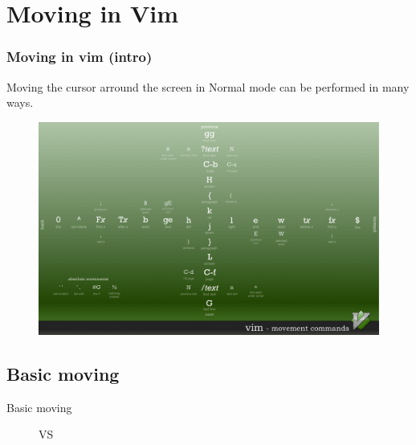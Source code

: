\documentclass{beamer}
\begin{document}
\section{Moving in Vim}
\begin{frame}
  \frametitle{Moving in vim (intro)}
  Moving the cursor arround the screen in Normal mode can be performed in many ways. 
  \begin{figure}
    \includegraphics[width=0.8\linewidth]{graphics/movement.png}
  \end{figure}
\end{frame}
\subsection{Basic moving}
\begin{frame}{Basic moving}
  \begin{figure}[htp] 
    \centering
      VS
  \end{figure}
\end{frame}
\end{document}
